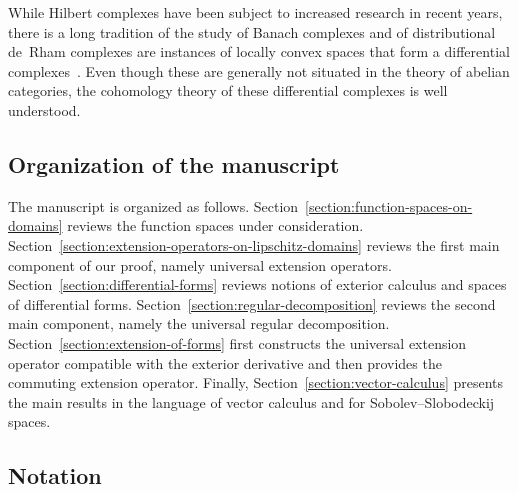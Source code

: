 \documentclass[10pt,a4paper]{amsart}
\theoremstyle{definition}
\theoremstyle{remark}
\numberwithin{equation}{section}
\begin{document}
While Hilbert complexes have been subject to increased research in recent years, there is a long tradition of the study of Banach complexes and of distributional de~Rham complexes are instances of locally convex spaces that form a differential complexes~\cite{palamodov1972homological,khelemskij1989homology,kuzminov1998homological,kuzminov2003compactness}. 
Even though these are generally not situated in the theory of abelian categories, the cohomology theory of these differential complexes is well understood.


\subsection{Organization of the manuscript}

The manuscript is organized as follows.
Section~\ref{section:function-spaces-on-domains} reviews the function spaces under consideration.
Section~\ref{section:extension-operators-on-lipschitz-domains} reviews the first main component of our proof, namely universal extension operators.
Section~\ref{section:differential-forms} reviews notions of exterior calculus and spaces of differential forms.
Section~\ref{section:regular-decomposition} reviews the second main component, namely the universal regular decomposition. 
Section~\ref{section:extension-of-forms} first constructs the universal extension operator compatible with the exterior derivative and then provides the commuting extension operator.
Finally, Section~\ref{section:vector-calculus} presents the main results in the language of vector calculus and for Sobolev--Slobodeckij spaces. 


\subsection*{Notation}
\end{document}
